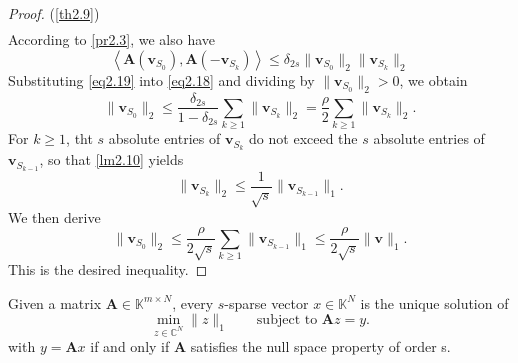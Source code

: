 \begin{proof} {(\cref{th2.9})}
\begin{eqnarray}
        \label{eq2.18}
    \end{eqnarray}
    According to \cref{pr2.3}, we also have
    \begin{equation}
        \left<\mathbf{A}(\mathbf{v}_{S_0}), \mathbf{A}(-\mathbf{v}_{S_k})\right> \leq \delta_{2s} \|\mathbf{v}_{S_0}\|_2 \|\mathbf{v}_{S_k}\|_2
        \label{eq2.19}
    \end{equation}
    Substituting \cref{eq2.19} into \cref{eq2.18} and dividing by $\|\mathbf{v}_{S_0}\|_2 > 0$, we obtain
    \[
        \|\mathbf{v}_{S_0}\|_2 \leq \frac{\delta_{2s}}{1-\delta_{2s}} \sum\limits_{k \geq 1} \|\mathbf{v}_{S_k}\|_2 = \frac{\rho}{2} \sum\limits_{k \geq 1} \|\mathbf{v}_{S_k}\|_2.
    \]
    For $k \geq 1$, tht $s$ absolute entries of $\mathbf{v}_{S_k}$ do not exceed the $s$ absolute entries of $\mathbf{v}_{S_{k-1}}$, so that \cref{lm2.10} yields
    \[
        \|\mathbf{v}_{S_k}\|_2 \leq \frac{1}{\sqrt{s}} \|\mathbf{v}_{S_{k-1}}\|_1.
    \]
    We then derive
    \[
        \|\mathbf{v}_{S_0}\|_2 \leq \frac{\rho}{2 \sqrt{s}} \sum\limits_{k \geq 1} \|\mathbf{v}_{S_{k-1}}\|_1 \leq \frac{\rho}{2 \sqrt{s}} \|\mathbf{v}\|_1.
    \]
    This is the desired inequality.
\end{proof}

\begin{mdframed}
    \begin{theorem}
        \label{th-1.5}
        Given a matrix $\mathbf{A} \in \mathbb{K}^{m \times N}$, every $s$-sparse vector $x \in \mathbb{K}^N$ is the unique solution of 
        \[
            \min\limits_{z \in \mathbb{C}^N} \|z\|_1 \qquad \text{subject to } \mathbf{A}z = y.
        \]
        with $y = \mathbf{A}x$ if and only if $\mathbf{A}$ satisfies the null space property of order s.
    \end{theorem}
\end{mdframed}

